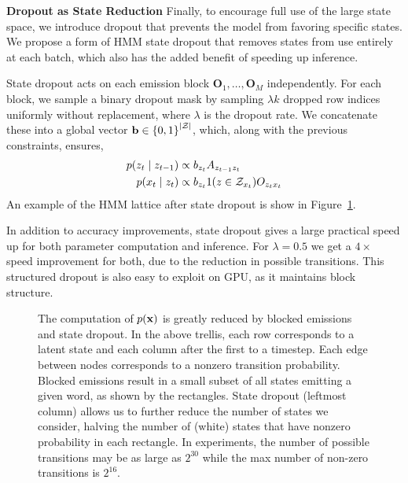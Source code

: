 \documentclass[11pt,a4paper]{article}
\begin{document}
\vspace{0.2cm}

\noindent
\textbf{Dropout as State Reduction}
Finally, to encourage full use of the large state space,
we introduce dropout that prevents the model from favoring specific states. 
We propose a form of HMM state dropout that removes states from use entirely
at each batch,
which also has the added benefit of speeding up inference.

State dropout acts on each emission block $\mathbf{O}_1, \ldots, \mathbf{O}_M$ independently.
For each block, we sample a binary dropout mask by sampling
$ \lambda k$ dropped row indices uniformly without replacement,
where $\lambda$ is the dropout rate.
We concatenate these into a global vector $\mathbf{b}\in\left\{0,1\right\}^{|\mathcal{Z}|}$, which, along with the previous constraints, 
ensures,
\begin{equation}
\label{eqn:state_dropout}
\begin{aligned}
p(z_t \mid z_{t-1}) &\propto b_{z_t}A_{z_{t-1}z_t}\\
p(x_t \mid z_t) &\propto b_{z_t}1(z \in \mathcal{Z}_{x_t})O_{z_t x_t}
\end{aligned}
\end{equation}
An example of the HMM lattice after state dropout is show in Figure~\ref{fig:trellis}.


In addition to accuracy improvements, state dropout gives a large practical speed up for both parameter computation and inference.
For $\lambda=0.5$ we get a $4\times$ speed improvement for both,
due to the reduction in possible transitions.
This structured dropout is also easy to exploit on GPU,
as it maintains block structure.

\begin{figure}[!t]
\begin{center}

\end{center}
\caption{
\label{fig:trellis}
The computation of $p(\mathbf{x})$ is greatly reduced by blocked emissions and state dropout.
In the above trellis, each row corresponds to a latent state and each column after 
the first to a timestep.
Each edge between nodes corresponds to a nonzero transition probability.
Blocked emissions result in a small subset of all states emitting a given word,
as shown by the rectangles. 
State dropout (leftmost column) allows us to further reduce the number of states we consider,
halving the number of (white) states that have nonzero probability in each rectangle. In experiments, the number of possible transitions may be as large as $2^{30}$ while the max number of non-zero transitions is $2^{16}$.
}
\end{figure}
\end{document}
